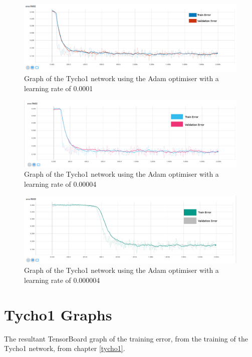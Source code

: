 \documentclass[12pt,a4paper,oneside,oldfontcommands]{memoir}
\begin{document}
\begin{Declaration Of OriginalityOrginality}
\begin{figure}[H]
  \centering
    \includegraphics[width=\linewidth]{graphs/A/tycho_1_ADAM_0001_sigmoid.png}
    \caption{Graph of the Tycho1 network using the Adam optimiser with a learning rate of 0.0001}
\end{figure}

\begin{figure}[H]
  \centering
    \includegraphics[width=\linewidth]{graphs/A/tycho_1_ADAM_4e-05_sigmoid.png}
    \caption{Graph of the Tycho1 network using the Adam optimiser with a learning rate of 0.00004}
\end{figure}

\begin{figure}[H]
  \centering
    \includegraphics[width=\linewidth]{graphs/A/tycho_1_ADAM_4e-06_sigmoid.png}
    \caption{Graph of the Tycho1 network using the Adam optimiser with a learning rate of 0.000004}
\end{figure}

\chapter{Tycho1 Graphs}

The resultant TensorBoard graph of the training error, from the training of the Tycho1 network, from chapter \ref{tycho1}.
 

\end{Declaration Of OriginalityOrginality}
\end{document}

